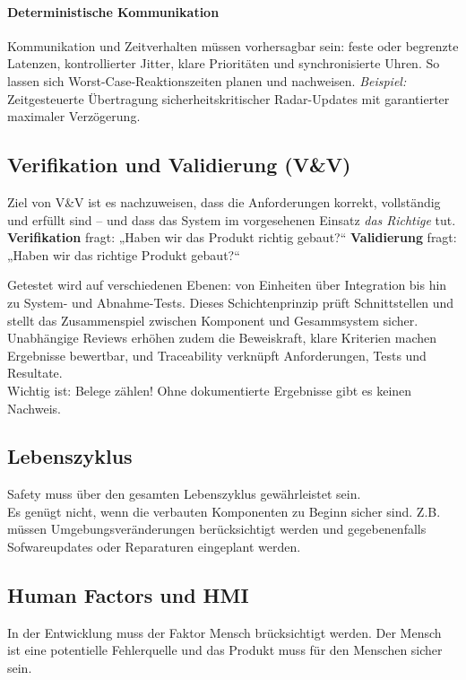 \paragraph{Deterministische Kommunikation}
Kommunikation und Zeitverhalten müssen vorhersagbar sein: feste oder begrenzte Latenzen, kontrollierter Jitter, klare Prioritäten und synchronisierte Uhren. So lassen sich Worst-Case-Reaktionszeiten planen und nachweisen.
\emph{Beispiel:} Zeitgesteuerte Übertragung sicherheitskritischer Radar-Updates mit garantierter maximaler Verzögerung.

\subsection{Verifikation und Validierung (V\&V)}
Ziel von V\&V ist es nachzuweisen, dass die Anforderungen korrekt, vollständig und erfüllt sind – und dass das System im vorgesehenen Einsatz \emph{das Richtige} tut.
\textbf{Verifikation} fragt: „Haben wir das Produkt richtig gebaut?“
\textbf{Validierung} fragt: „Haben wir das richtige Produkt gebaut?“

Getestet wird auf verschiedenen Ebenen: von Einheiten über Integration bis hin zu System- und Abnahme-Tests. 
Dieses Schichtenprinzip prüft Schnittstellen und stellt das Zusammenspiel zwischen Komponent und Gesammsystem sicher. 
Unabhängige Reviews erhöhen zudem die Beweiskraft, klare Kriterien machen Ergebnisse bewertbar, und Traceability verknüpft Anforderungen, Tests und Resultate. \\
Wichtig ist: Belege zählen! Ohne dokumentierte Ergebnisse gibt es keinen Nachweis.


\subsection{Lebenszyklus}
Safety muss über den gesamten Lebenszyklus gewährleistet sein.\\
Es genügt nicht, wenn die verbauten Komponenten zu Beginn sicher sind. Z.B. müssen Umgebungsveränderungen berücksichtigt werden 
und gegebenenfalls Sofwareupdates oder Reparaturen eingeplant werden.

\subsection{Human Factors und HMI}
In der Entwicklung muss der Faktor Mensch brücksichtigt werden.
Der Mensch ist eine potentielle Fehlerquelle und das Produkt muss für den Menschen sicher sein.

